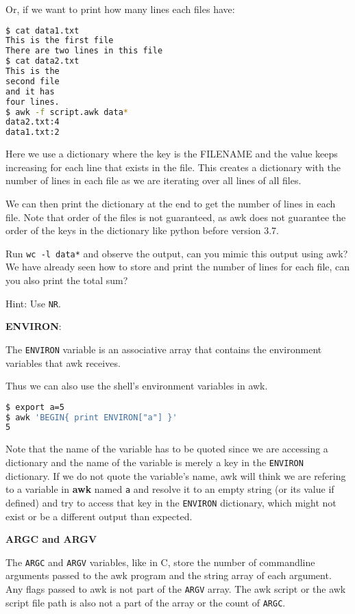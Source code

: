 Or, if we want to print how many lines each files have:

\begin{lstlisting}[language=bash]
$ cat data1.txt
This is the first file
There are two lines in this file
$ cat data2.txt
This is the
second file
and it has
four lines.
$ awk -f script.awk data*
data2.txt:4
data1.txt:2
\end{lstlisting}

Here we use a dictionary where the key is the FILENAME and the value keeps increasing for each line that exists in the file. This creates a dictionary with the number of lines in each file as we are iterating over all lines of all files.

We can then print the dictionary at the end to get the number of lines in each file.
Note that order of the files is not guaranteed, as awk does not guarantee the order of the keys in the dictionary like python before version 3.7.

\begin{exercise}
  Run \lstinline|wc -l data*| and observe the output, can you mimic this output using awk? We have already seen how to store and print the number of lines for each file, can you also print the total sum?

  Hint: Use \lstinline|NR|.
\end{exercise}

\textbf{ENVIRON}:

The \lstinline|ENVIRON| variable is an associative array that contains the environment variables that awk receives.

Thus we can also use the shell's environment variables in awk.

\begin{lstlisting}[language=bash]
$ export a=5
$ awk 'BEGIN{ print ENVIRON["a"] }'
5
\end{lstlisting}

Note that the name of the variable has to be quoted since we are accessing a dictionary and the name of the variable is merely a key in the \lstinline|ENVIRON| dictionary. If we do not quote the variable's name, awk will think we are refering to a variable in \textbf{awk} named \lstinline|a| and resolve it to an empty string (or its value if defined) and try to access that key in the \lstinline|ENVIRON| dictionary, which might not exist or be a different output than expected.

\textbf{ARGC and ARGV}

The \lstinline|ARGC| and \lstinline|ARGV| variables, like in C, store the number of commandline arguments passed to the awk program and the string array of each argument.
Any flags passed to awk is not part of the \lstinline|ARGV| array. The awk script or the awk script file path is also not a part of the array or the count of \lstinline|ARGC|.

